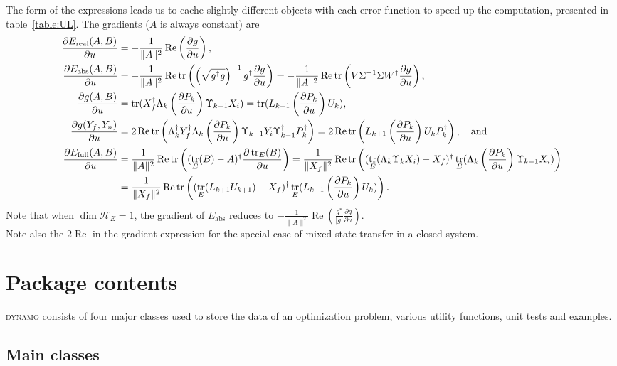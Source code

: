 \documentclass[aps, pra, a4paper, longbibliography, superscriptaddress]{revtex4-1}
\newcommand{\hilb}[1]{\mathcal{#1}}
\DeclareMathOperator{\tr}{tr}
\DeclareMathOperator{\re}{Re}
\newcommand{\spr}{\Upsilon}
\newcommand{\dd}[2]{\frac{\partial #1}{\partial #2}}
\newcommand{\DYNAMO}{\textsc{dynamo}}
\begin{document}
The form of the expressions leads us to cache slightly different objects with
each error function to speed up the computation, presented in table~\ref{table:UL}.
The gradients ($A$ is always constant) are
\begin{align}
\dd{E_\text{real}(A,B)}{u}
&= -\frac{1}{\|A\|^2} \re \left( \dd{g}{u} \right),\\
\dd{E_\text{abs}(A,B)}{u}
&= -\frac{1}{\|A\|^2} \re \tr \left(\left(\sqrt{g^\dagger g}\right)^{-1} g^\dagger \dd{g}{u}\right)
= -\frac{1}{\|A\|^2} \re \tr \left(V \Sigma^{-1} \Sigma W^\dagger \dd{g}{u}\right),\\
\dd{g(A, B)}{u} &= \tr(X_f^\dagger \Lambda_{k} \left(\dd{P_k}{u}\right) \spr_{k-1} X_i)
= \tr(L_{k+1} \left(\dd{P_k}{u}\right) U_{k}),\\
\dd{g(Y_f, Y_n)}{u} &= 2 \re \tr\left(\Lambda_k^\dagger Y_f^\dagger \Lambda_k \left(\dd{P_k}{u}\right) \spr_{k-1} Y_i \spr_{k-1}^\dagger P_k^\dagger \right)
= 2 \re \tr\left(L_{k+1} \left(\dd{P_k}{u}\right) U_{k} P_k^\dagger \right), \quad \text{and}\\
\notag
\dd{E_\text{full}(A, B)}{u}
&= \frac{1}{\|A\|^2} \re \tr\left((\tr_E(B)-A)^\dagger \dd{\tr_E(B)}{u}\right)
= \frac{1}{\|X_f\|^2} \re \tr\left((\tr_E(\Lambda_k \spr_k X_i) -X_f)^\dagger  \tr_E(\Lambda_{k} \left(\dd{P_k}{u}\right) \spr_{k-1} X_i) \right)\\
&= \frac{1}{\|X_f\|^2} \re \tr\left((\tr_E(L_{k+1} U_{k+1}) -X_f)^\dagger  \tr_E(L_{k+1} \left(\dd{P_k}{u}\right) U_{k}) \right).
\end{align}
Note that when $\dim \hilb{H}_E = 1$, the gradient of $E_\text{abs}$
reduces to
$-\frac{1}{\|A\|^2} \re \left(\frac{g^*}{|g|} \dd{g}{u} \right)$.\\
Note also the $2 \re$ in the gradient expression  
for the special case of mixed state transfer in a closed system.








\section{Package contents}

\DYNAMO{} consists of four major classes used to store the data of an
optimization problem, various utility functions, unit tests and examples.

\subsection{Main classes}
\end{document}
